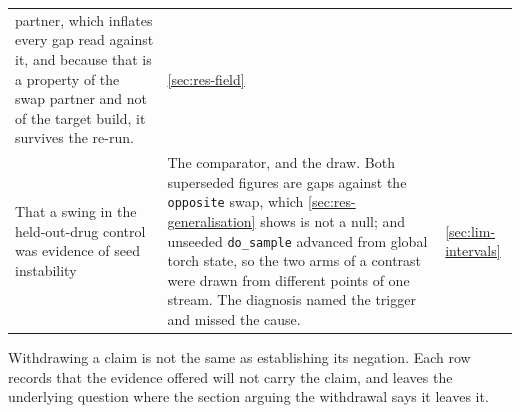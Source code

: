 \begin{table}[htbp]
\begin{fullwidth}
\begin{threeparttable}
\begin{tabularx}{\linewidth}{@{}L{46mm} Y l@{}}
    partner, which inflates every gap read against it, and because that is a
    property of the swap partner and not of the target build, it survives the
    re-run.
  & \cref{sec:res-field} \\
\addlinespace[10pt]
That a swing in the held-out-drug control was evidence of seed instability
  & The comparator, and the draw. Both superseded figures are gaps against the
    \texttt{opposite} swap, which \cref{sec:res-generalisation} shows is not a
    null; and unseeded \texttt{do\_sample} advanced from global torch state, so
    the two arms of a contrast were drawn from different points of one stream.
    The diagnosis named the trigger and missed the cause.
  & \cref{sec:lim-intervals} \\
\end{tabularx}
\begin{tablenotes}[flushleft]
\item Withdrawing a claim is not the same as establishing its negation. Each row
records that the evidence offered will not carry the claim, and leaves the
underlying question where the section arguing the withdrawal says it leaves it.
\end{tablenotes}
\end{threeparttable}
\end{fullwidth}
\end{table}
